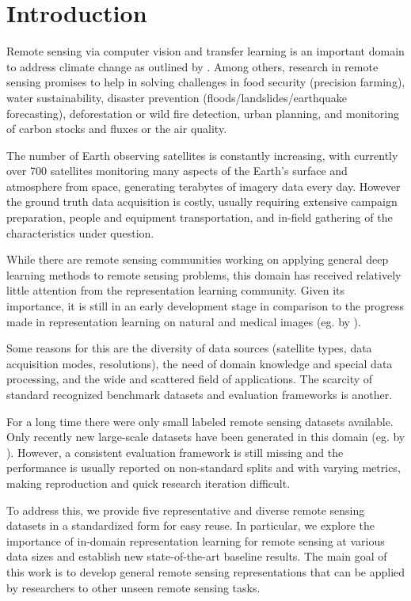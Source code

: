 \section{Introduction}
Remote sensing via computer vision and transfer learning is an important domain to address climate change as outlined by \citet{rolnick2019:climate_change_ml}. Among others, research in remote sensing promises to help in solving challenges in food security (precision farming), water sustainability, disaster prevention (floods/landslides/earthquake forecasting), deforestation or wild fire detection, urban planning, and monitoring of carbon stocks and fluxes or the air quality.

The number of Earth observing satellites is constantly increasing, with currently over 700 satellites monitoring many aspects of the Earth's surface and atmosphere from space, generating terabytes of imagery data every day. However the ground truth data acquisition is costly, usually requiring extensive campaign preparation, people and equipment transportation, and in-field gathering of the characteristics under question.

While there are remote sensing communities working on applying general deep learning methods to remote sensing problems, this domain has received relatively little attention from the representation learning community.
Given its importance, it is still in an early development stage in comparison to the progress made in representation learning on natural and medical images (eg. by \cite{raghu2019:transfusion}).

Some reasons for this are the diversity of data sources (satellite types, data acquisition modes, resolutions), the need of domain knowledge and special data processing, and the wide and scattered field of applications. The scarcity of standard recognized benchmark datasets and evaluation frameworks is another.

For a long time there were only small labeled remote sensing datasets available. Only recently new large-scale datasets have been generated in this domain (eg. by \citet{zhu2018:so2sat, sumbul2019:bigearthnet}). However, a consistent evaluation framework is still missing and the performance is usually reported on non-standard splits and with varying metrics, making reproduction and quick research iteration difficult.



To address this, we provide five representative and diverse remote sensing datasets in a standardized form for easy reuse. In particular, we explore the importance of in-domain representation learning for remote sensing at various data sizes and establish new state-of-the-art baseline results. The main goal of this work is to develop general remote sensing representations that can be applied by researchers to other unseen remote sensing tasks.

